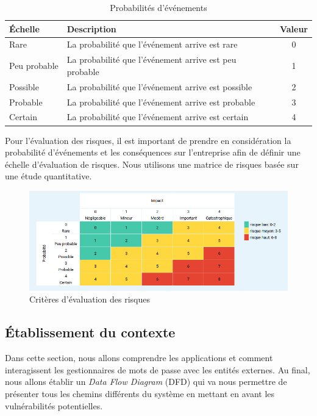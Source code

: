 \begin{table}[H]
	\centering
	\begin{tabular}{llc}
		\hline
		Échelle      & Description                                            & Valeur \\ \hline
		Rare         & La probabilité que l'événement arrive est rare         & 0      \\
		Peu probable & La probabilité que l'événement arrive est peu probable & 1      \\
		Possible     & La probabilité que l'événement arrive est possible     & 2      \\
		Probable     & La probabilité que l'événement arrive est probable     & 3      \\
		Certain      & La probabilité que l'événement arrive est certain      & 4      \\ \hline
	\end{tabular}
	\caption{Probabilités d'événements}
\end{table}

Pour l'évaluation des risques, il est important de prendre en considération la probabilité d'événements et les conséquences sur l'entreprise afin de définir une échelle d'évaluation de risques. Nous utilisons une matrice de risques basée sur une étude quantitative\cite{matrix}.

\begin{figure}[H]
	\centering
	\includegraphics[width=15.5cm]{images/risque_evaluation.png}
	\centering
	\caption{Critères d'évaluation des risques \label{Critères d'évaluation des risques}}
\end{figure}

\subsection{Établissement du contexte}
Dans cette section, nous allons comprendre les applications et comment interagissent les gestionnaires de mots de passe avec les entités externes. Au final, nous allons établir un \textit{Data Flow Diagram} (DFD) qui va nous permettre de présenter tous les chemins différents du système en mettant en avant les vulnérabilités potentielles.

